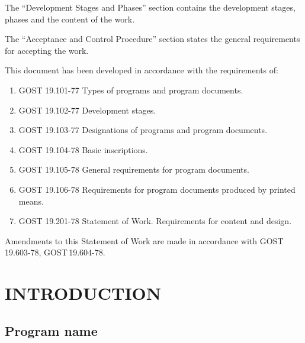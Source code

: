 \documentclass[12pt,a4paper]{extarticle}
\begin{document}
The \enquote{Development Stages and Phases} section contains the development stages, phases and the content of the work.

The \enquote{Acceptance and Control Procedure} section states the general requirements for accepting the work.

\clearpage

\noindent
This document has been developed in accordance with the requirements of:

\begin{enumerate}[label=\arabic*), leftmargin=1.25cm]
\item GOST 19.101-77 Types of programs and program documents\cite{gost19101}.
\item GOST 19.102-77 Development stages\cite{gost19102}.
\item GOST 19.103-77 Designations of programs and program documents\cite{gost19103}.
\item GOST 19.104-78 Basic inscriptions\cite{gost19104}.
\item GOST 19.105-78 General requirements for program documents\cite{gost19105}.
\item GOST 19.106-78 Requirements for program documents produced by printed means\cite{gost19106}.
\item GOST 19.201-78 Statement of Work. Requirements for content and design\cite{gost19201}.
\end{enumerate}

Amendments to this Statement of Work are made in accordance with GOST\,19.603-78\cite{gost19603}, GOST\,19.604-78\cite{gost19604}.

\clearpage

\hypersetup{linkcolor=black}
\tableofcontents
\hypersetup{linkcolor=blue}
\thispagestyle{fancy}
\clearpage

\section{INTRODUCTION}

\subsection{Program name}
\end{document}
